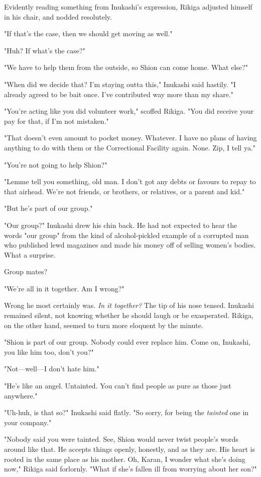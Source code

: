 Evidently reading something from Inukashi's expression, Rikiga adjusted
himself in his chair, and nodded resolutely.

"If that's the case, then we should get moving as well."

"Huh? If what's the case?"

"We have to help them from the outside, so Shion can come home. What
else?"

"When did we decide that? I'm staying outta this," Inukashi said
hastily. "I already agreed to be bait once. I've contributed way more
than my share."

"You're acting like you did volunteer work," scoffed Rikiga. "You did
receive your pay for that, if I'm not mistaken."

"That doesn't even amount to pocket money. Whatever. I have no plans of
having anything to do with them or the Correctional Facility again.
None. Zip, I tell ya."

"You're not going to help Shion?"

"Lemme tell you something, old man. I don't got any debts or favours to
repay to that airhead. We're not friends, or brothers, or relatives, or
a parent and kid."

"But he's part of our group."

"Our group?" Inukashi drew his chin back. He had not expected to hear
the words "our group" from the kind of alcohol-pickled example of a
corrupted man who published lewd magazines and made his money off of
selling women's bodies. What a surprise.

Group mates?

"We're all in it together. Am I wrong?"

Wrong he most certainly was. \emph{In it together?} The tip of his nose tensed.
Inukashi remained silent, not knowing whether he should laugh or be
exasperated. Rikiga, on the other hand, seemed to turn more eloquent by
the minute.

"Shion is part of our group. Nobody could ever replace him. Come on,
Inukashi, you like him too, don't you?"

"Not---well---I don't hate him."

"He's like an angel. Untainted. You can't find people as pure as those
just anywhere."

"Uh-huh, is that so?" Inukashi said flatly. "So sorry, for being the
\emph{tainted} one in your company."

"Nobody said you were tainted. See, Shion would never twist people's
words around like that. He accepts things openly, honestly, and as they
are. His heart is rooted in the same place as his mother. Oh, Karan, I
wonder what she's doing now," Rikiga said forlornly. "What if she's
fallen ill from worrying about her son?"

